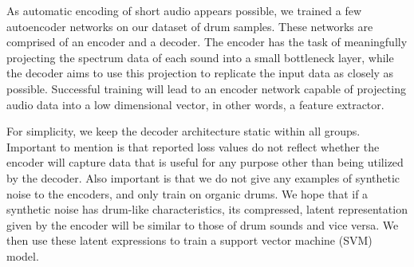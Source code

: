 \documentclass[\main/thesis.tex]{subfiles}
\begin{document}
As automatic encoding of short audio appears possible, we trained a few autoencoder networks on our dataset of drum samples. These networks are comprised of an encoder and a decoder. The encoder has the task of meaningfully projecting the spectrum data of each sound into a small bottleneck layer, while the decoder aims to use this projection to replicate the input data as closely as possible. Successful training will lead to an encoder network capable of projecting audio data into a low dimensional vector, in other words, a feature extractor. 

 For simplicity, we keep the decoder architecture static within all groups. Important to mention is that reported loss values do not reflect whether the encoder will capture data that is useful for any purpose other than being utilized by the decoder. Also important is that we do not give any examples of synthetic noise to the encoders, and only train on organic drums. We hope that if a synthetic noise has drum-like characteristics, its compressed, latent representation given by the encoder will be similar to those of drum sounds and vice versa. We then use these latent expressions to train a support vector machine (SVM) model.
\end{document}
